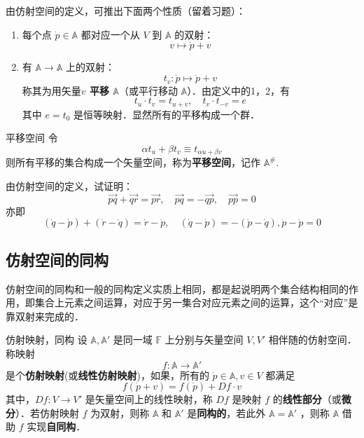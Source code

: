 由仿射空间的定义，可推出下面两个性质（留着习题）：
\begin{enumerate}
\item 每个点 $\dot p\in \mathbb A$ 都对应一个从 $V$ 到 $\mathbb A$ 的双射：
\begin{equation}
v\mapsto \dot p+v
\end{equation}

\item 有 $\mathbb A\rightarrow\mathbb A$ 上的双射：
\begin{equation}\label{AfSp_eq3}
t_v:\dot p\mapsto\dot p+v
\end{equation}
 称其为用矢量\textbf{$v$ 平移 $\mathbb A$}（或平行移动 $\mathbb A$）．由定义中的1，2，有
 \begin{equation}
 t_u\cdot t_v=t_{u+v},\quad t_v\cdot t_{-v}=e
 \end{equation}
  其中 $e=t_0$ 是恒等映射．显然所有的平移构成一个群．
\end{enumerate}
\begin{definition}{平移空间}
令
\begin{equation}
\alpha t_u+\beta t_v\equiv t_{\alpha u+\beta v}
\end{equation}
则所有平移的集合构成一个矢量空间，称为\textbf{平移空间}，记作 $\mathbb A^{\#}$.
\end{definition}
\begin{example}{}
由仿射空间的定义，试证明：
\begin{equation}\label{AfSp_eq1}
\vec{pq}+\vec{qr}=\vec{pr},\quad \vec{pq}=-\vec{qp},\quad\vec{pp}=0
\end{equation}
亦即
\begin{equation}
(\dot q-\dot p )+(\dot r-\dot q)=\dot r-\dot p,\quad(\dot q-\dot p)=-(\dot p-\dot q),\dot p-\dot p=0
\end{equation}

\end{example}
\subsection{仿射空间的同构}
仿射空间的同构和一般的同构定义实质上相同，都是起说明两个集合结构相同的作用，即集合上元素之间运算，对应于另一集合对应元素之间的运算，这个“对应”是靠双射来完成的．
\begin{definition}{仿射映射，同构}\label{AfSp_def2}
设 $\mathbb A,\mathbb A'$ 是同一域 $\mathbb F$ 上分别与矢量空间 $V,V'$ 相伴随的仿射空间．称映射 
\begin{equation}
f:\mathbb A\rightarrow\mathbb A' 
\end{equation}
是个\textbf{仿射映射}(或\textbf{线性仿射映射})，如果，所有的 $\dot p\in \mathbb A,v\in V$ 都满足
\begin{equation}
f(\dot p+v)=f(\dot p)+Df\cdot v
\end{equation}
 其中，$Df:V\rightarrow V'$ 是矢量空间上的线性映射，称 $Df$ 是映射 $f$ 的\textbf{线性部分}（或\textbf{微分}）．若仿射映射 $f$ 为双射，则称 $\mathbb A$ 和 $\mathbb A'$ 是\textbf{同构的}，若此外 $\mathbb A=\mathbb A'$ ，则称 $\mathbb A$ 借助 $f$ 实现\textbf{自同构}．
\end{definition}

